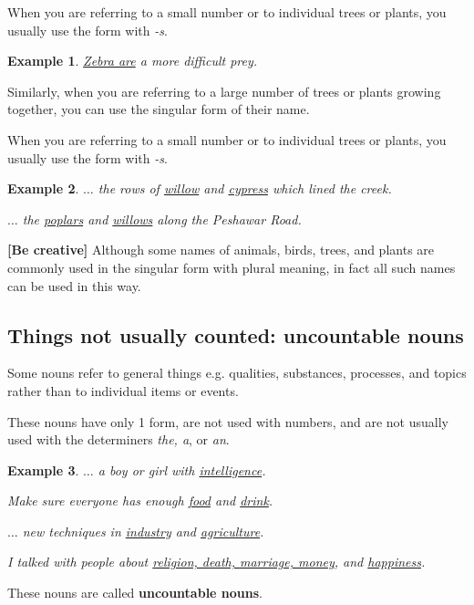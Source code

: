 \documentclass[oneside]{book}
\numberwithin{equation}{section}
\newtheorem{example}{Example}[section]
\begin{document}
When you are referring to a small number or to individual trees or plants, you usually use the form with \textit{-s}.
\begin{example}
    \underline{Zebra are} a more difficult prey.
\end{example}
Similarly, when you are referring to a large number of trees or plants growing together, you can use the singular form of their name.

When you are referring to a small number or to individual trees or plants, you usually use the form with \textit{-s}.
\begin{example}
    $\ldots$ the rows of \underline{willow} and \underline{cypress} which lined the creek.
    
    $\ldots$ the \underline{poplars} and \underline{willows} along the Peshawar Road.
\end{example}
%
\noindent{} \textbf{[Be creative]} Although some names of animals, birds, trees, and plants are commonly used in the singular form with plural meaning, in fact all such names can be used in this way.

\subsection{Things not usually counted: uncountable nouns}
%
\noindent{} Some nouns refer to general things e.g. qualities, substances, processes, and topics rather than to individual items or events.

These nouns have only 1 form, are not used with numbers, and are not usually used with the determiners \textit{the, a}, or \textit{an}.
\begin{example}
    $\ldots$ a boy or girl with \underline{intelligence}.
    
    Make sure everyone has enough \underline{food} and \underline{drink}.
    
    $\ldots$ new techniques in \underline{industry} and \underline{agriculture}.
    
    I talked with people about \underline{religion, death, marriage, money}, and \underline{happiness}.
\end{example}
These nouns are called \textbf{uncountable nouns}.
\end{document}
